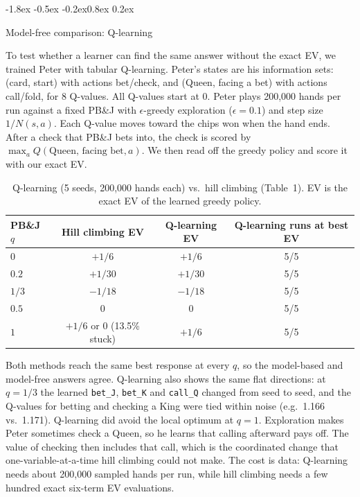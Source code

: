 \documentclass{article}
\makeatletter
\renewcommand{\subsection}{\@startsection{subsection}{2}{\z@}%
    {-1.8ex \@plus -0.5ex \@minus -0.2ex}{0.8ex \@plus 0.2ex}%
    {\normalsize\bf\raggedright}}
\makeatother
\begin{document}
\subsection{Model-free comparison: Q-learning}

To test whether a learner can find the same answer without the exact EV, we trained Peter with tabular Q-learning. Peter's states are his information sets: (card, start) with actions bet/check, and (Queen, facing a bet) with actions call/fold, for 8 Q-values. All Q-values start at 0. Peter plays 200{,}000 hands per run against a fixed PB\&J with $\epsilon$-greedy exploration ($\epsilon = 0.1$) and step size $1/N(s,a)$. Each Q-value moves toward the chips won when the hand ends. After a check that PB\&J bets into, the check is scored by $\max_a Q(\text{Queen, facing bet}, a)$. We then read off the greedy policy and score it with our exact EV.

\begin{table}[h]
\centering
\caption{Q-learning (5 seeds, 200{,}000 hands each) vs.\ hill climbing (Table~1). EV is the exact EV of the learned greedy policy.}
\begin{tabular}{lccc}
\toprule
PB\&J $q$ & Hill climbing EV & Q-learning EV & Q-learning runs at best EV \\
\midrule
$0$       & $+1/6$             & $+1/6$  & 5/5 \\
$0.2$     & $+1/30$            & $+1/30$ & 5/5 \\
$1/3$     & $-1/18$            & $-1/18$ & 5/5 \\
$0.5$     & $0$                & $0$     & 5/5 \\
$1$       & $+1/6$ or $0$ (13.5\% stuck) & $+1/6$ & 5/5 \\
\bottomrule
\end{tabular}
\end{table}

Both methods reach the same best response at every $q$, so the model-based and model-free answers agree. Q-learning also shows the same flat directions: at $q = 1/3$ the learned \texttt{bet\_J}, \texttt{bet\_K} and \texttt{call\_Q} changed from seed to seed, and the Q-values for betting and checking a King were tied within noise (e.g.\ 1.166 vs.\ 1.171). Q-learning did avoid the local optimum at $q = 1$. Exploration makes Peter sometimes check a Queen, so he learns that calling afterward pays off. The value of checking then includes that call, which is the coordinated change that one-variable-at-a-time hill climbing could not make. The cost is data: Q-learning needs about 200{,}000 sampled hands per run, while hill climbing needs a few hundred exact six-term EV evaluations.
\end{document}
